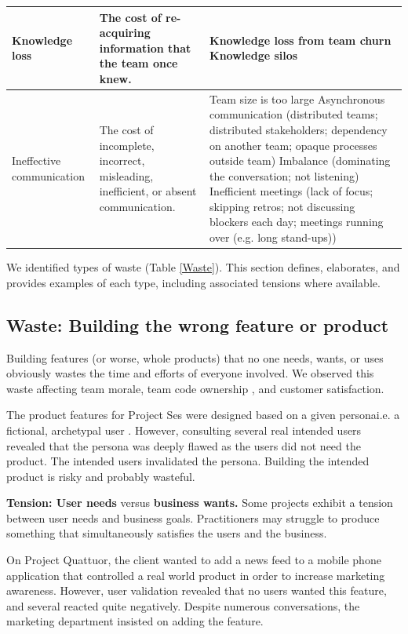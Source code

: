 \begin{table}[t]
\begin{tabular}{|p{1.5in}|p{1.9in}|p{3.2in}|}
Knowledge loss & The cost of re-acquiring information that the team once knew. & 
Knowledge loss from team churn \newline
Knowledge silos 
\\ \hline
Ineffective communication             & The cost of incomplete, incorrect, misleading, inefficient, or absent communication.                         & 
Team size is too large \newline Asynchronous communication (distributed teams; distributed stakeholders; dependency on another team; opaque processes outside team) \newline Imbalance (dominating the conversation; not listening) \newline Inefficient meetings (lack of focus; skipping retros; not discussing blockers each day; meetings running over (e.g. long stand-ups)) \\ \hline                  
\end{tabular}
\end{table}




We identified \numberOfWastes{} types of waste (Table \ref{Waste}). This section defines, elaborates, and provides examples of each type, including associated tensions where available.
\subsection{Waste: Building the wrong feature or product}
Building features (or worse, whole products) that no one needs, wants, or uses obviously wastes the time and efforts of everyone involved. We observed this waste affecting team morale, team code ownership \cite{SedanoTeamCodeOwnership}, and customer satisfaction. 

The product features for Project Ses were designed based on a given persona\textemdash i.e. a fictional, archetypal user \cite{Grudin2002personas}. However, consulting several real intended users revealed that the persona was deeply flawed as the users did not need the product. The intended users invalidated the persona. Building the intended product is risky and probably wasteful. 

\textbf{Tension: User needs} versus \textbf{business wants.}
Some projects exhibit a tension between user needs and business goals. Practitioners may struggle to produce something that simultaneously satisfies the users and the business.

On Project Quattuor, the client wanted to add a news feed to a mobile phone application that controlled a real world product in order to increase marketing awareness. However, user validation revealed that no users wanted this feature, and several reacted quite negatively. Despite numerous conversations, the marketing department insisted on adding the feature. 

